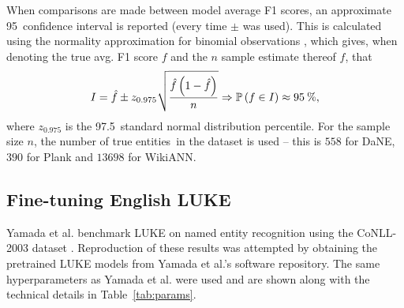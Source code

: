 \documentclass[main.tex]{subfiles}
\begin{document}
When comparisons are made between model average F1 scores, an approximate 95\pro\ confidence interval is reported (every time $\pm$ was used).
This is calculated using the normality approximation for binomial observations \cite[Method 7.3]{brockhoff2018stat}, which gives, when denoting the true avg. F1 score $f$ and the $n$ sample estimate thereof $\hat f$, that
\begin{equation}
    \label{eq:ci}
    I = \hat f \pm z_{0.975}
    \sqrt{
        \frac
        {\hat f\left(1-\hat f\right)}
        {n}
    }
    \Rightarrow
    \mathbb P\left(
        f \in I
    \right)
    \approx 95\:\text{\%{}},
\end{equation}
where $z_{0.975}$ is the 97.5\pro\ standard normal distribution percentile.
For the sample size $n$, the number of true entities\footnotemark\ in the dataset is used -- this is $558$ for DaNE, $390$ for Plank and $13698$ for WikiANN.

\subsection{Fine-tuning English LUKE}
Yamada et al. benchmark LUKE on named entity recognition using the CoNLL-2003 dataset \cite{yamada2020luke}.
Reproduction of these results was attempted by obtaining the pretrained LUKE models from Yamada et al.'s software repository.
The same hyperparameters as Yamada et al. were used and are shown along with the technical details in Table~\ref{tab:params}.
\end{document}
